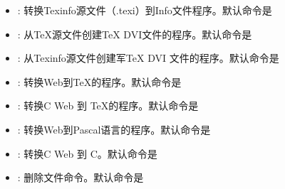 \documentclass[a4paper,10pt]{sphinxmanual}
\begin{document}
\begin{itemize}
\item {} 
 : 转换Texinfo源文件（.texi）到Info文件程序。默认命令是 

\item {} 
 : 从TeX源文件创建TeX DVI文件的程序。默认命令是 

\item {} 
 : 从Texinfo源文件创建军TeX DVI 文件的程序。默认命令是 

\item {} 
 : 转换Web到TeX的程序。默认命令是 

\item {} 
 : 转换C Web 到 TeX的程序。默认命令是 

\item {} 
 : 转换Web到Pascal语言的程序。默认命令是 

\item {} 
 : 转换C Web 到 C。默认命令是 

\item {} 
 : 删除文件命令。默认命令是 

\end{itemize}
\end{document}
